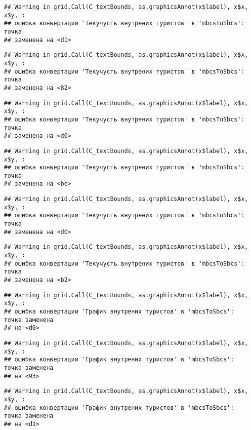 \documentclass[
]{article}
\begin{document}
\begin{verbatim}
## Warning in grid.Call(C_textBounds, as.graphicsAnnot(x$label), x$x, x$y, :
## ошибка конвертации 'Текучусть внутрених туристов' в 'mbcsToSbcs': точка
## заменена на <d1>
\end{verbatim}

\begin{verbatim}
## Warning in grid.Call(C_textBounds, as.graphicsAnnot(x$label), x$x, x$y, :
## ошибка конвертации 'Текучусть внутрених туристов' в 'mbcsToSbcs': точка
## заменена на <82>
\end{verbatim}

\begin{verbatim}
## Warning in grid.Call(C_textBounds, as.graphicsAnnot(x$label), x$x, x$y, :
## ошибка конвертации 'Текучусть внутрених туристов' в 'mbcsToSbcs': точка
## заменена на <d0>
\end{verbatim}

\begin{verbatim}
## Warning in grid.Call(C_textBounds, as.graphicsAnnot(x$label), x$x, x$y, :
## ошибка конвертации 'Текучусть внутрених туристов' в 'mbcsToSbcs': точка
## заменена на <be>
\end{verbatim}

\begin{verbatim}
## Warning in grid.Call(C_textBounds, as.graphicsAnnot(x$label), x$x, x$y, :
## ошибка конвертации 'Текучусть внутрених туристов' в 'mbcsToSbcs': точка
## заменена на <d0>
\end{verbatim}

\begin{verbatim}
## Warning in grid.Call(C_textBounds, as.graphicsAnnot(x$label), x$x, x$y, :
## ошибка конвертации 'Текучусть внутрених туристов' в 'mbcsToSbcs': точка
## заменена на <b2>
\end{verbatim}

\begin{verbatim}
## Warning in grid.Call(C_textBounds, as.graphicsAnnot(x$label), x$x, x$y, :
## ошибка конвертации 'График внутрених туристов' в 'mbcsToSbcs': точка заменена
## на <d0>
\end{verbatim}

\begin{verbatim}
## Warning in grid.Call(C_textBounds, as.graphicsAnnot(x$label), x$x, x$y, :
## ошибка конвертации 'График внутрених туристов' в 'mbcsToSbcs': точка заменена
## на <93>
\end{verbatim}

\begin{verbatim}
## Warning in grid.Call(C_textBounds, as.graphicsAnnot(x$label), x$x, x$y, :
## ошибка конвертации 'График внутрених туристов' в 'mbcsToSbcs': точка заменена
## на <d1>
\end{verbatim}
\end{document}
